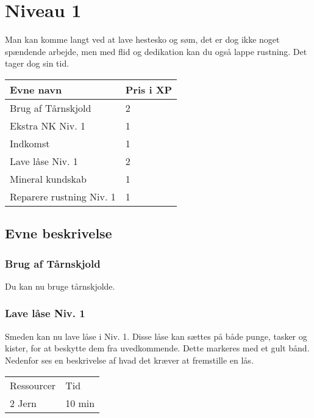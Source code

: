 \chapter*{Niveau 1}
Man kan komme langt ved at lave hestesko og søm, det er dog ikke noget spændende arbejde, men med flid og dedikation kan du også lappe rustning. Det tager dog sin tid.
\begin{table}[H]
    \centering
    \begin{tabular}{|p{}|p{}|}
    \rowcolor{cerulean!80}\hline
        Evne navn & Pris i XP \\\hline
         Brug af Tårnskjold & 2 \\\hline
         Ekstra NK Niv. 1 & 1 \\\hline
         Indkomst & 1\\\hline
         Lave låse Niv. 1 & 2\\\hline
         Mineral kundskab & 1\\\hline
         Reparere rustning Niv. 1 & 1\\\hline
    \end{tabular}
\end{table}

\section*{Evne beskrivelse}
\subsection*{Brug af Tårnskjold}
Du kan nu bruge tårnskjolde.





\subsection*{Lave låse Niv. 1}
Smeden kan nu lave låse i Niv. 1. Disse låse kan sættes på både punge, tasker og kister, for at beskytte dem fra uvedkommende. Dette markeres med et gult bånd.
Nedenfor ses en beskrivelse af hvad det kræver at fremstille en lås.\\

\begin{table}[H]
    \centering
    \begin{tabular}{|p{}|p{}|}
    \hline
    \rowcolor{cerulean!80}
    \multicolumn{2}{c}{Lås Niv. 1}\\
    \hline
    \rowcolor{cerulean!40}
         Ressourcer & Tid \\\hline
         2 Jern & 10 min\\\hline
    \end{tabular}
    \end{table}
    


